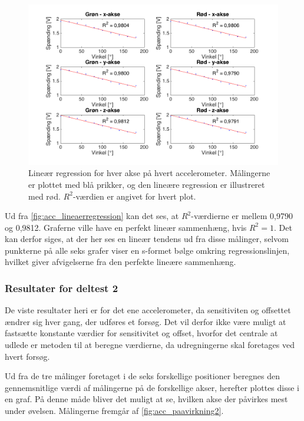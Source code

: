 \begin{figure}[H]
\centering
\includegraphics[width=1.0\textwidth]{figures/lineaerregression}
\caption{Lineær regression for hver akse på hvert accelerometer. Målingerne er plottet med blå prikker, og den lineære regression er illustreret med rød. $R^2$-værdien er angivet for hvert plot.}
\label{fig:acc_lineaerregression}
\end{figure}

Ud fra \autoref{fig:acc_lineaerregression} kan det ses, at $R^2$-værdierne er mellem 0,9790 og 0,9812. Graferne ville have en perfekt lineær sammenhæng, hvis $R^2=1$. Det kan derfor siges, at der her ses en lineær tendens ud fra disse målinger, selvom punkterne på alle seks grafer viser en s-formet bølge omkring regressionslinjen, hvilket giver afvigelserne fra den perfekte lineære sammenhæng.

\subsubsection{Resultater for deltest 2}
De viste resultater heri er for det ene accelerometer, da sensitiviten og offsettet ændrer sig hver gang, der udføres et forsøg. Det vil derfor ikke være muligt at fastsætte konstante værdier for sensitivitet og offset, hvorfor det centrale at udlede er metoden til at beregne værdierne, da udregningerne skal foretages ved hvert forsøg.

Ud fra de tre målinger foretaget i de seks forskellige positioner beregnes den gennemsnitlige værdi af målingerne på de forskellige akser, herefter plottes disse i en graf. På denne måde bliver det muligt at se, hvilken akse der påvirkes mest under øvelsen. Målingerne fremgår af \autoref{fig:acc_paavirkning2}. 

